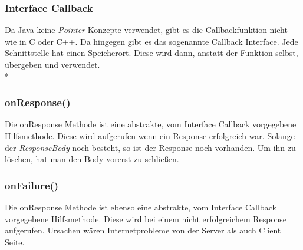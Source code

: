 \subsubsection{Interface Callback}
\cite{Callback}
Da Java keine \textit{Pointer} Konzepte verwendet, gibt es die Callbackfunktion nicht wie in C oder C++.
Da hingegen gibt es das sogenannte Callback Interface.
Jede Schnittstelle hat einen Speicherort. Diese wird dann, anstatt der Funktion selbst, übergeben und verwendet.
\\*

\subsubsection{onResponse()}
Die onResponse Methode ist eine abstrakte, vom Interface Callback vorgegebene Hilfsmethode. Diese wird aufgerufen 
wenn ein Response erfolgreich war. Solange der \textit{ResponseBody} noch besteht, so ist der Response noch vorhanden.
Um ihn zu löschen, hat man den Body vorerst zu schließen.

\subsubsection{onFailure()}
Die onResponse Methode ist ebenso eine abstrakte, vom Interface Callback vorgegebene Hilfsmethode. Diese wird bei einem
nicht erfolgreichem Response aufgerufen. Ursachen wären Internetprobleme von der Server als auch Client Seite. 




